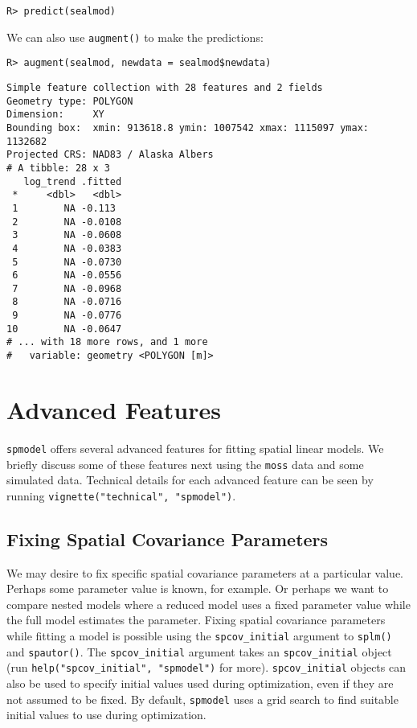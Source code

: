 \documentclass[10pt,letterpaper]{article}
\begin{document}
\begin{verbatim}
R> predict(sealmod)
\end{verbatim}

\noindent We can also use \texttt{augment()} to make the predictions:

\begin{verbatim}
R> augment(sealmod, newdata = sealmod$newdata)
\end{verbatim}

\begin{verbatim}
Simple feature collection with 28 features and 2 fields
Geometry type: POLYGON
Dimension:     XY
Bounding box:  xmin: 913618.8 ymin: 1007542 xmax: 1115097 ymax: 1132682
Projected CRS: NAD83 / Alaska Albers
# A tibble: 28 x 3
   log_trend .fitted
 *     <dbl>   <dbl>
 1        NA -0.113 
 2        NA -0.0108
 3        NA -0.0608
 4        NA -0.0383
 5        NA -0.0730
 6        NA -0.0556
 7        NA -0.0968
 8        NA -0.0716
 9        NA -0.0776
10        NA -0.0647
# ... with 18 more rows, and 1 more
#   variable: geometry <POLYGON [m]>
\end{verbatim}

\hypertarget{sec:advfeatures}{%
\section{Advanced Features}\label{sec:advfeatures}}

\texttt{spmodel} offers several advanced features for fitting spatial
linear models. We briefly discuss some of these features next using the
\texttt{moss} data and some simulated data. Technical details for each
advanced feature can be seen by running
\texttt{vignette("technical",\ "spmodel")}.

\hypertarget{sec:spcov_init}{%
\subsection{Fixing Spatial Covariance Parameters}\label{sec:spcov_init}}

We may desire to fix specific spatial covariance parameters at a
particular value. Perhaps some parameter value is known, for example. Or
perhaps we want to compare nested models where a reduced model uses a
fixed parameter value while the full model estimates the parameter.
Fixing spatial covariance parameters while fitting a model is possible
using the \texttt{spcov\_initial} argument to \texttt{splm()} and
\texttt{spautor()}. The \texttt{spcov\_initial} argument takes an
\texttt{spcov\_initial} object (run
\texttt{help("spcov\_initial",\ "spmodel")} for more).
\texttt{spcov\_initial} objects can also be used to specify initial
values used during optimization, even if they are not assumed to be
fixed. By default, \texttt{spmodel} uses a grid search to find suitable
initial values to use during optimization.
\end{document}
